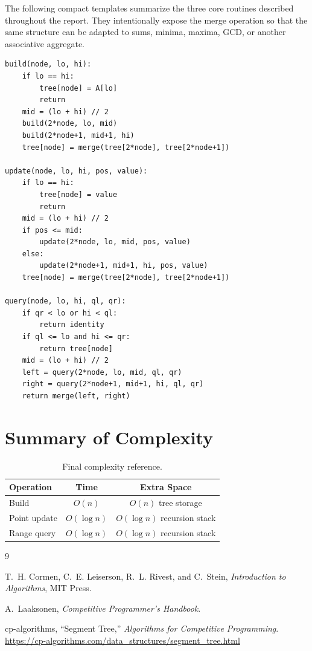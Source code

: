 \documentclass[11pt,open=any]{scrreprt}
\begin{document}
The following compact templates summarize the three core routines described throughout the report. They intentionally expose the merge operation so that the same structure can be adapted to sums, minima, maxima, GCD, or another associative aggregate.

\begin{lstlisting}
build(node, lo, hi):
    if lo == hi:
        tree[node] = A[lo]
        return
    mid = (lo + hi) // 2
    build(2*node, lo, mid)
    build(2*node+1, mid+1, hi)
    tree[node] = merge(tree[2*node], tree[2*node+1])

update(node, lo, hi, pos, value):
    if lo == hi:
        tree[node] = value
        return
    mid = (lo + hi) // 2
    if pos <= mid:
        update(2*node, lo, mid, pos, value)
    else:
        update(2*node+1, mid+1, hi, pos, value)
    tree[node] = merge(tree[2*node], tree[2*node+1])

query(node, lo, hi, ql, qr):
    if qr < lo or hi < ql:
        return identity
    if ql <= lo and hi <= qr:
        return tree[node]
    mid = (lo + hi) // 2
    left = query(2*node, lo, mid, ql, qr)
    right = query(2*node+1, mid+1, hi, ql, qr)
    return merge(left, right)
\end{lstlisting}

\chapter{Summary of Complexity}
\begin{table}[H]
\centering
\caption{Final complexity reference.}
\begin{tabular}{lcc}
\toprule
\textbf{Operation} & \textbf{Time} & \textbf{Extra Space}\\
\midrule
Build & $O(n)$ & $O(n)$ tree storage\\
Point update & $O(\log n)$ & $O(\log n)$ recursion stack\\
Range query & $O(\log n)$ & $O(\log n)$ recursion stack\\
\bottomrule
\end{tabular}
\end{table}

\begin{thebibliography}{9}

T.~H. Cormen, C.~E. Leiserson, R.~L. Rivest, and C.~Stein, \textit{Introduction to Algorithms}, MIT Press.

A.~Laaksonen, \textit{Competitive Programmer's Handbook}.

cp-algorithms, ``Segment Tree,'' \textit{Algorithms for Competitive Programming}. \url{https://cp-algorithms.com/data_structures/segment_tree.html}

\end{thebibliography}
\end{document}
